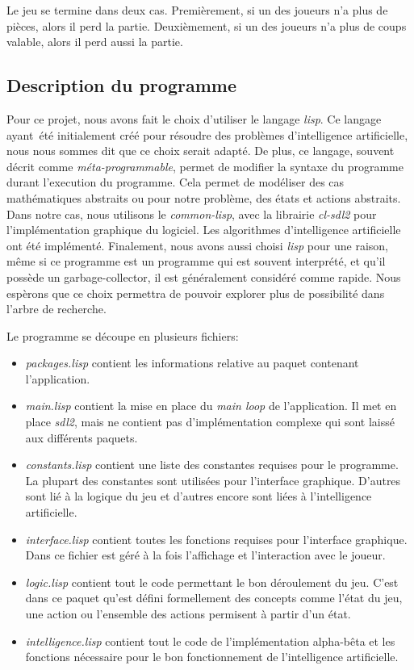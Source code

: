 \documentclass[a4paper,11pt]{article}
\begin{document}
\begin{multicols}{2}[]
    Le jeu se termine dans deux cas. Premièrement, si un des joueurs n'a plus
    de pièces, alors il perd la partie. Deuxièmement, si un des joueurs n'a
    plus de coups valable, alors il perd aussi la partie.

  \subsection{Description du programme}

    Pour ce projet, nous avons fait le choix d'utiliser le langage \emph{lisp}.
    Ce langage ayant été initialement créé pour résoudre des problèmes
    d'intelligence artificielle, nous nous sommes dit que ce choix serait
    adapté. De plus, ce langage, souvent décrit comme \emph{méta-programmable},
    permet de modifier la syntaxe du programme durant l'execution du programme.
    Cela permet de modéliser des cas mathématiques abstraits ou pour notre
    problème, des états et actions abstraits. Dans notre cas, nous utilisons le
    \emph{common-lisp}, avec la librairie \emph{cl-sdl2} pour l'implémentation
    graphique du logiciel. Les algorithmes d'intelligence artificielle ont été
    implémenté. Finalement, nous avons aussi choisi \emph{lisp} pour une
    raison, même si ce programme est un programme qui est souvent interprété,
    et qu'il possède un garbage-collector, il est généralement considéré comme
    rapide. Nous espèrons que ce choix permettra de pouvoir explorer plus de
    possibilité dans l'arbre de recherche.

    Le programme se découpe en plusieurs fichiers:

  \begin{itemize}
    \item \emph{packages.lisp} contient les informations relative au paquet
      contenant l'application.
    \item \emph{main.lisp} contient la mise en place du \emph{main loop} de
      l'application. Il met en place \emph{sdl2}, mais ne contient pas
      d'implémentation complexe qui sont laissé aux différents paquets.
    \item \emph{constants.lisp} contient une liste des constantes requises pour
      le programme. La plupart des constantes sont utilisées pour l'interface
      graphique. D'autres sont lié à la logique du jeu et d'autres encore sont
      liées à l'intelligence artificielle.
    \item \emph{interface.lisp} contient toutes les fonctions requises pour
      l'interface graphique. Dans ce fichier est géré à la fois l'affichage et
      l'interaction avec le joueur.
    \item \emph{logic.lisp} contient tout le code permettant le bon déroulement
      du jeu. C'est dans ce paquet qu'est défini formellement des concepts comme
      l'état du jeu, une action ou l'ensemble des actions permisent à partir
      d'un état.
    \item \emph{intelligence.lisp} contient tout le code de l'implémentation
      alpha-bêta et les fonctions nécessaire pour le bon fonctionnement de
      l'intelligence artificielle.
  \end{itemize}


\end{multicols}
\end{document}
